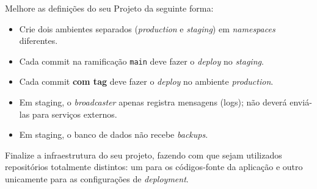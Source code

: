 \documentclass[11pt,a4paper]{article}
\begin{document}
\begin{tcolorbox}[colback=blue!5!white,colframe=blue!75!black,title=Exercício 4.9: O projeto, etapa 25]
Melhore as definições do seu Projeto da seguinte forma:
\begin{itemize}
    \item Crie dois ambientes separados (\textit{production} e \textit{staging}) em \textit{namespaces} diferentes.
    \item Cada commit na ramificação \texttt{main} deve fazer o \textit{deploy} no \textit{staging}.
    \item Cada commit \textbf{com tag} deve fazer o \textit{deploy} no ambiente \textit{production}.
    \item Em staging, o \textit{broadcaster} apenas registra mensagens (logs); não deverá enviá-las para serviços externos.
    \item Em staging, o banco de dados não recebe \textit{backups}.
\end{itemize}
\end{tcolorbox}

\begin{tcolorbox}[colback=blue!5!white,colframe=blue!75!black,title=Exercício 4.10: O projeto, o grand finale]
Finalize a infraestrutura do seu projeto, fazendo com que sejam utilizados repositórios totalmente distintos: um para os códigos-fonte da aplicação e outro unicamente para as configurações de \textit{deployment}.
\end{tcolorbox}
\end{document}
